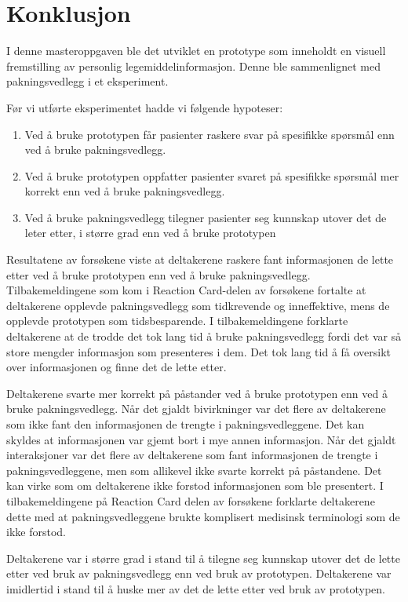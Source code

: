 \chapter{Konklusjon} \label{chap:konklusjon}
I denne masteroppgaven ble det utviklet en prototype som inneholdt en visuell fremstilling av personlig legemiddelinformasjon. Denne ble sammenlignet med pakningsvedlegg i et eksperiment. 

Før vi utførte eksperimentet hadde vi følgende hypoteser:
\begin{enumerate}
 \item Ved å bruke prototypen får pasienter raskere svar på spesifikke spørsmål enn ved å bruke pakningsvedlegg.
 \item Ved å bruke prototypen oppfatter pasienter svaret på spesifikke spørsmål mer korrekt enn ved å bruke pakningsvedlegg.
 \item Ved å bruke pakningsvedlegg tilegner pasienter seg kunnskap utover det de leter etter, i større grad enn ved å bruke prototypen
\end{enumerate}

Resultatene av forsøkene viste at deltakerene raskere fant informasjonen de lette etter ved å bruke prototypen enn ved å bruke pakningsvedlegg. Tilbakemeldingene som kom i Reaction Card-delen av forsøkene fortalte at deltakerene opplevde pakningsvedlegg som tidkrevende og inneffektive, mens de opplevde prototypen som tidsbesparende. I tilbakemeldingene forklarte deltakerene at de trodde det tok lang tid å bruke pakningsvedlegg fordi det var så store mengder informasjon som presenteres i dem. Det tok lang tid å få oversikt over informasjonen og finne det de lette etter. 

Deltakerene svarte mer korrekt på påstander ved å bruke prototypen enn ved å bruke pakningsvedlegg. Når det gjaldt bivirkninger var det flere av deltakerene som ikke fant den informasjonen de trengte i pakningsvedleggene. Det kan skyldes at informasjonen var gjemt bort i mye annen informasjon. Når det gjaldt interaksjoner var det flere av deltakerene som fant informasjonen de trengte i pakningsvedleggene, men som allikevel ikke svarte korrekt på påstandene. Det kan virke som om deltakerene ikke forstod informasjonen som ble presentert. I tilbakemeldingene på Reaction Card delen av forsøkene forklarte deltakerene dette med at pakningsvedleggene brukte komplisert medisinsk terminologi som de ikke forstod. 

Deltakerene var i større grad i stand til å tilegne seg kunnskap utover det de lette etter ved bruk av pakningsvedlegg enn ved bruk av prototypen. Deltakerene var imidlertid i stand til å huske mer av det de lette etter ved bruk av prototypen.



